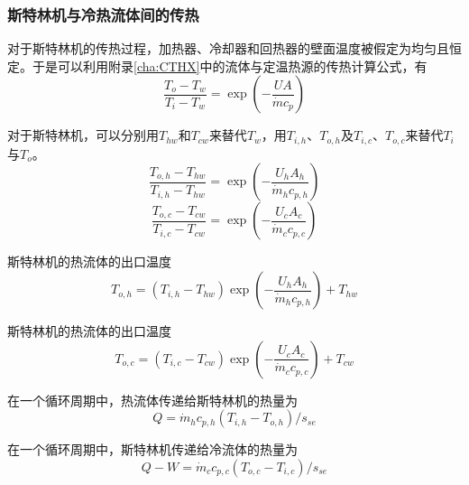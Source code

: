 \subsubsection{斯特林机与冷热流体间的传热}

对于斯特林机的传热过程，加热器、冷却器和回热器的壁面温度被假定为均匀且恒定。于是可以利用附录\ref{cha:CTHX}中的流体与定温热源的传热计算公式，有
\begin{equation}
	\frac{T_o-T_w}{T_i-T_w}=\exp(-\frac{UA}{\dot{m}c_p})
\end{equation}

对于斯特林机，可以分别用$T_{hw}$和$T_{cw}$来替代$T_w$，用$T_{i,h}$、$T_{o,h}$及$T_{i,c}$、$T_{o,c}$来替代$T_{i}$与$T_{o}$。
\begin{equation}
	\frac{T_{o,h}-T_{hw}}{T_{i,h}-T_{hw}}=\exp(-\frac{U_hA_h}{\dot{m}_hc_{p,h}})
	\label{eq:T_h}
\end{equation}
\begin{equation}
	\frac{T_{o,c}-T_{cw}}{T_{i,c}-T_{cw}}=\exp(-\frac{U_cA_c}{\dot{m}_cc_{p,c}})
	\label{eq:T_c}
\end{equation}

斯特林机的热流体的出口温度
\begin{equation}
	T_{o,h}=(T_{i,h}-T_{hw})\exp(-\frac{U_hA_h}{\dot{m}_hc_{p,h}}) + T_{hw}
	\label{eq:T_o_h}
\end{equation}

斯特林机的热流体的出口温度
\begin{equation}
	T_{o,c}=(T_{i,c}-T_{cw})\exp(-\frac{U_cA_c}{\dot{m}_cc_{p,c}}) + T_{cw}
	\label{eq:T_o_c}
\end{equation}

在一个循环周期中，热流体传递给斯特林机的热量为
\begin{equation}
	Q = \dot{m}_hc_{p,h}(T_{i,h}-T_{o,h})/s_{se}
	\label{eq:q_h}
\end{equation}

在一个循环周期中，斯特林机传递给冷流体的热量为
\begin{equation}
	 Q - W = \dot{m}_cc_{p,c}(T_{o,c}-T_{i,c})/s_{se}	\label{eq:q_c}
\end{equation}


